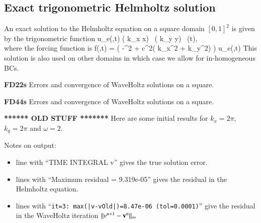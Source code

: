 \subsection{Exact trigonometric Helmholtz solution} \label{sec:trigHelmholtz}

An exact solution to the Helmholtz equation on a square domain $[0,1]^2$ is
given by the trigonometric function 
\bas
   u_e(\xv,t) \eqdef \sin( k_x x) \, \sin( k_y y) \, \cos(\omega t), \\
\eas
where the forcing function is
\bas
  f(\xv,t) = \Big( -\omega^2 + c^2( k_x^2 + k_y^2) \Big) u_e(\xv,t)
\eas
This solution is also used on other domains in which case we allow for in-homogeneous BCs.

\mni
\textbf{FD22s} Errors and convergence of WaveHoltz solutions on a square.


\mni
\textbf{FD44s} Errors and convergence of WaveHoltz solutions on a square.



\clearpage
\textbf{****** OLD STUFF *******}
Here are some initial results for $k_x=2\pi$, $k_y=2\pi$ and $\omega=2$. 

\noindent Notes on output: 
\begin{itemize}
  \item line with ``TIME INTEGRAL v'' gives the true solution error.
  \item lines with ``Maximum residual = 9.319e-05'' gives the residual in the Helmholtz equation.
  \item lines with ``\texttt{it=3:  max(|v-vOld|)=8.47e-06 (tol=0.0001)}'' give the residual in the
        WaveHoltz iteration $\| v^{n+1} - \mathbf{ v}^{n} \|_\infty$
\end{itemize}


